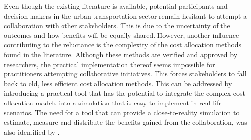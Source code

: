 Even though the existing literature is available, potential participants and decision-makers in the urban transportation sector remain hesitant to attempt a collaboration with other stakeholders. This is due to the uncertainty of the outcomes and how benefits will be equally shared. However, another influence contributing to the reluctance is the complexity of the cost allocation methods found in the literature. Although these methods are verified and approved by researchers, the practical implementation thereof seems impossible for practitioners attempting collaborative initiatives. This forces stakeholders to fall back to old, less efficient cost allocation methods. This can be addressed by introducing a practical tool that has the potential to integrate the complex cost allocation models into a simulation that is easy to implement in real-life scenarios. The need for a tool that can provide a close-to-reality simulation to estimate, measure and distribute the benefits gained from the collaboration, was also identified by \citet{cruijssen2007horizontal}.\par

